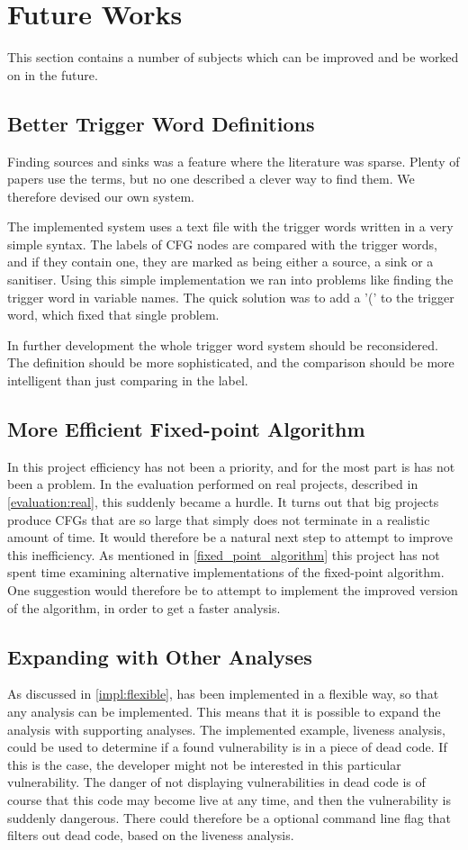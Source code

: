 \section{Future Works}
This section contains a number of subjects which can be improved and be worked on in the future.

\subsection{Better Trigger Word Definitions}
Finding sources and sinks was a feature where the literature was sparse.
Plenty of papers use the terms, but no one described a clever way to find them.
We therefore devised our own system.

The implemented system uses a text file with the trigger words written in a very simple syntax.
The labels of CFG nodes are compared with the trigger words, and if they contain one, they are marked as being either a source, a sink or a sanitiser.
Using this simple implementation we ran into problems like finding the trigger word in variable names.
The quick solution was to add a '(' to the trigger word, which fixed that single problem.

In further development the whole trigger word system should be reconsidered.
The definition should be more sophisticated, and the comparison should be more intelligent than just comparing in the label.

\subsection{More Efficient Fixed-point Algorithm}
In this project efficiency has not been a priority, and for the most part is has not been a problem.
In the evaluation performed on real projects, described in \cref{evaluation:real}, this suddenly became a hurdle.
It turns out that big projects produce CFGs that are so large that \pyt{} simply does not terminate in a realistic amount of time.
It would therefore be a natural next step to attempt to improve this inefficiency.
As mentioned in \cref{fixed_point_algorithm} this project has not spent time examining alternative implementations of the fixed-point algorithm.
One suggestion would therefore be to attempt to implement the improved version of the algorithm, in order to get a faster analysis.

\subsection{Expanding \pyt{} with Other Analyses}
As discussed in \cref{impl:flexible}, \pyt{} has been implemented in a flexible way, so that any analysis can be implemented.
This means that it is possible to expand the analysis with supporting analyses.
The implemented example, liveness analysis, could be used to determine if a found vulnerability is in a piece of dead code.
If this is the case, the developer might not be interested in this particular vulnerability.
The danger of not displaying vulnerabilities in dead code is of course that this code may become live at any time, and then the vulnerability is suddenly dangerous.
There could therefore be a optional command line flag that filters out dead code, based on the liveness analysis.

